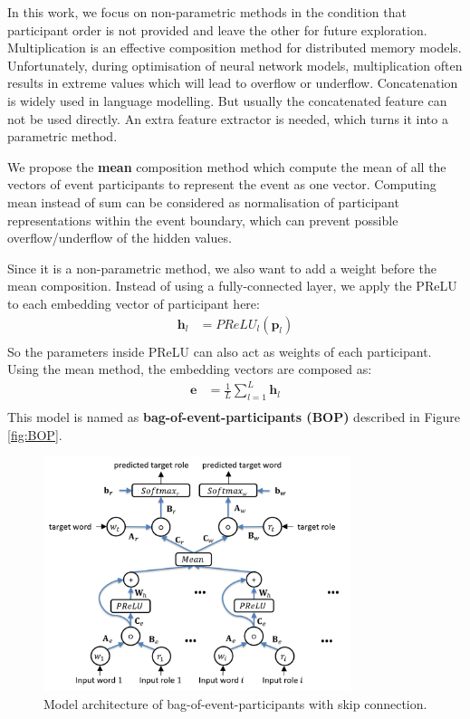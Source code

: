 \documentclass[a4paper]{article}
\begin{document}
In this work, we focus on non-parametric methods in the condition that participant order is not provided and leave the other for future exploration. Multiplication is an effective composition method for distributed memory models. Unfortunately, during optimisation of neural network models, multiplication often results in extreme values which will lead to overflow or underflow. Concatenation is widely used in language modelling. But usually the concatenated feature can not be used directly. An extra feature extractor is needed, which turns it into a parametric method. 

We propose the \textbf{mean} composition method which compute the mean of all the  vectors of event participants to represent the event as one vector. Computing mean instead of sum can be considered as normalisation of participant representations within the event boundary, which can prevent possible overflow/underflow of the hidden values. 

Since it is a non-parametric method, we also want to add a weight before the mean composition. Instead of using a fully-connected layer, we apply the PReLU to each embedding vector of participant here: 
\begin{equation} \label{eq:nonlinearity_bop}
\begin{aligned}
    \mathbf{h}_l
        &= PReLU_l(\mathbf{p}_l) \\
\end{aligned}
\end{equation}
So the parameters inside PReLU can also act as weights of each participant. Using the mean method, the embedding vectors are composed as:
\begin{equation} \label{eq:mean_comp_bop}
\begin{aligned}
    \mathbf{e}
        &= \frac{1}{L} \sum_{l=1}^{L} \mathbf{h}_{l} \\
\end{aligned}
\end{equation}
This model is named as \textbf{bag-of-event-participants (BOP)} described in Figure \ref{fig:BOP}. 


\begin{figure}[t]
\centering
\includegraphics[width=0.8\textwidth]{BOPRes.png}
\caption{\label{fig:BOPRes} Model architecture of bag-of-event-participants with skip connection.}
\end{figure}
\end{document}
